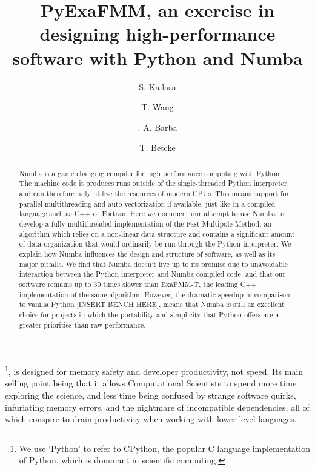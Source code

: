 \documentclass{IEEEcsmag}
\begin{document}

\title{PyExaFMM, an exercise in designing high-performance software with Python and Numba}

\author{S. Kailasa}

\author{T. Wang}

\author{. A. Barba}

\author{T. Betcke}


\begin{abstract}
Numba is a game changing compiler for high performance computing with Python. The machine code it produces runs outside of the single-threaded Python interpreter, and can therefore fully utilize the resources of modern CPUs. This means support for parallel multithreading and auto vectorization if available, just like in a compiled language such as C++ or Fortran. Here we document our attempt to use Numba to develop a fully multithreaded implementation of the Fast Multipole Method, an algorithm which relies on a non-linear data structure and contains a significant amount of data organization that would ordinarily be run through the Python interpreter. We explain how Numba influences the design and structure of software, as well as its major pitfalls. We find that Numba doesn't live up to its promise due to unavoidable interaction between the Python interpreter and Numba compiled code, and that our software remains up to 30 times slower than ExaFMM-T, the leading C++ implementation of the same algorithm. However, the dramatic speedup in comparison to vanilla Python [INSERT BENCH HERE], means that Numba is still an excellent choice for projects in which the portability and simplicity that Python offers are a greater priorities than raw performance.
\end{abstract}

\maketitle
{}\footnote{We use `Python' to refer to CPython, the popular C language implementation of Python, which is dominant in scientific computing.}, is designed for memory safety and developer productivity, not speed. Its main selling point being that it allows Computational Scientists to spend more time exploring the science, and less time being confused by strange software quirks, infuriating memory errors, and the nightmare of incompatible dependencies, all of which conspire to drain productivity when working with lower level languages.
\end{document}

